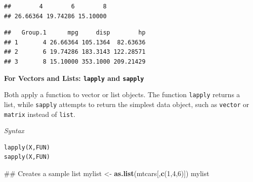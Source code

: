 \documentclass[]{article}
\newenvironment{Shaded}{\begin{snugshade}}{\end{snugshade}}
\newcommand{\KeywordTok}[1]{\textcolor[rgb]{0.13,0.29,0.53}{\textbf{{#1}}}}
\newcommand{\DecValTok}[1]{\textcolor[rgb]{0.00,0.00,0.81}{{#1}}}
\newcommand{\StringTok}[1]{\textcolor[rgb]{0.31,0.60,0.02}{{#1}}}
\newcommand{\NormalTok}[1]{{#1}}
\numberwithin{equation}{section}
\begin{document}
\begin{Shaded}
\end{Shaded}

\begin{verbatim}
##        4        6        8 
## 26.66364 19.74286 15.10000
\end{verbatim}

\begin{Shaded}
\end{Shaded}

\begin{verbatim}
##   Group.1      mpg     disp        hp
## 1       4 26.66364 105.1364  82.63636
## 2       6 19.74286 183.3143 122.28571
## 3       8 15.10000 353.1000 209.21429
\end{verbatim}

\textbf{For Vectors and Lists: \texttt{lapply} and \texttt{sapply}}

Both apply a function to vector or list objects. The function
\texttt{lapply} returns a list, while \texttt{sapply} attempts to return
the simplest data object, such as \texttt{vector} or \texttt{matrix}
instead of \texttt{list}.

\emph{Syntax}

\begin{verbatim}
lapply(X,FUN)
sapply(X,FUN)
\end{verbatim}

\begin{Shaded}
\begin{Highlighting}[]
\NormalTok{## Creates a sample list}
\NormalTok{mylist <-}\StringTok{ }\KeywordTok{as.list}\NormalTok{(mtcars[,}\KeywordTok{c}\NormalTok{(}\DecValTok{1}\NormalTok{,}\DecValTok{4}\NormalTok{,}\DecValTok{6}\NormalTok{)])}
\NormalTok{mylist}
\end{Highlighting}
\end{Shaded}
\end{document}
